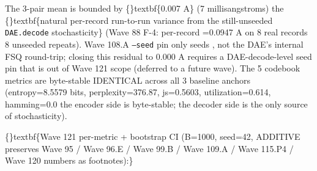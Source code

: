 \documentclass{article}
\begin{document}
\begin{table}[ht]
\centering
\small
{}%
\end{table}

The 3-pair mean  is bounded by \{\}textbf\{0.007 A\} (7 millisangstroms)  the \{\}textbf\{natural per-record run-to-run variance from the still-unseeded \texttt{DAE.decode} stochasticity\} (Wave 88 F-4: per-record =0.0947 A on 8 real records  8 unseeded repeats). Wave 108.A \texttt{--seed} pin only seeds , not the DAE's internal FSQ round-trip; closing this residual to 0.000 A requires a DAE-decode-level seed pin that is out of Wave 121 scope (deferred to a future wave). The 5 codebook metrics are byte-stable IDENTICAL across all 3 baseline anchors (entropy=8.5579 bits, perplexity=376.87, js=0.5603, utilization=0.614, hamming=0.0  the encoder side is byte-stable; the decoder side is the only source of stochasticity).

\{\}textbf\{Wave 121 per-metric  + bootstrap CI (B=1000, seed=42, ADDITIVE  preserves Wave 95 / Wave 96.E / Wave 99.B / Wave 109.A / Wave 115.P4 / Wave 120 numbers as footnotes):\}
\end{document}
